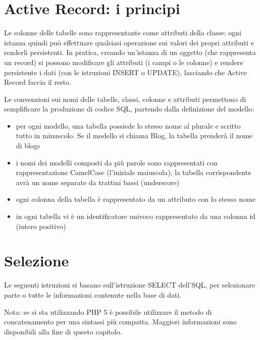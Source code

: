 \section*{Active Record: i principi}
Le colonne delle tabelle sono rappresentante come attributi della classe: ogni istanza quindi può effettuare qualsiasi operazione sui valori dei propri attributi e renderli persistenti. In pratica, creando un'istanza di un oggetto (che rappresenta un record) si possono modificare gli attributi (i campi o le colonne) e rendere persistente i dati (con le istruzioni INSERT o UPDATE), lasciando che Active Record faccia il resto.

Le convenzioni sui nomi delle tabelle, classi, colonne e attributi permettono di semplificare la produzione di codice SQL, partendo dalla definizione del modello:

\begin{itemize}
\item per ogni modello, una tabella possiede lo stesso nome al plurale e scritto tutto in minuscolo. Se il modello si chiama Blog, la tabella prenderà il nome di blogs
\item i nomi dei modelli composti da più parole sono rappresentati con rappresentazione CamelCase (l'iniziale maiuscola); la tabella corrispondente avrà un nome separate da trattini bassi (underscore)
\item ogni colonna della tabella è rappresentato da un attributo con lo stesso nome
\item in ogni tabella vi è un identificatore univoco rappresentato da una colonna id (intero positivo)
\end{itemize}

\section*{Selezione}
Le seguenti istruzioni si basano sull'istruzione SELECT dell'SQL, per selezionare parte o tutte le informazioni contenute nella base di dati.

Nota: se si sta utilizzando PHP 5 è possibile utilizzare il metodo di concatenamento per una sintassi più compatta. Maggiori informazioni sono disponibili alla fine di questo capitolo.

